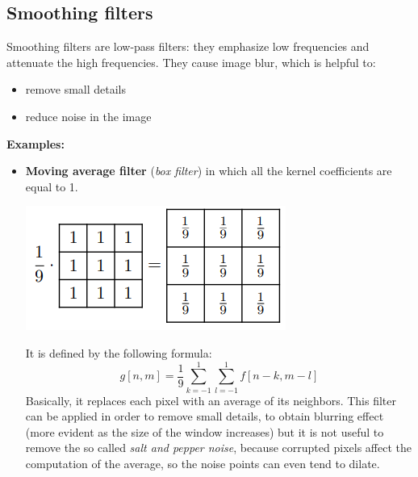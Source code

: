 \subsection{Smoothing filters}
Smoothing filters are low-pass filters: they emphasize low frequencies and attenuate the high frequencies. They cause image blur, which is helpful to:
\begin{itemize}
    \item remove small details
    \item reduce noise in the image
\end{itemize}
\textbf{Examples:}
\begin{itemize}
    \item \textbf{Moving average filter} (\textit{box filter}) in which all the kernel coefficients are equal to 1.
    \begin{center}
        \includegraphics[]{images/box filter.png}
    \end{center}
    It is defined by the following formula:
    \[g[n,m] = \frac{1}{9}\sum_{k=-1}^{1}\sum_{l=-1}^{1}f[n-k, m-l]\]
    Basically, it replaces each pixel with an average of its neighbors. This filter can be applied in order to remove small details, to obtain blurring effect (more evident as the size of the window increases) but it is not useful to remove the so called \textit{salt and pepper noise}, because corrupted pixels affect the computation of the average, so the noise points can even tend to dilate.

\end{itemize}

